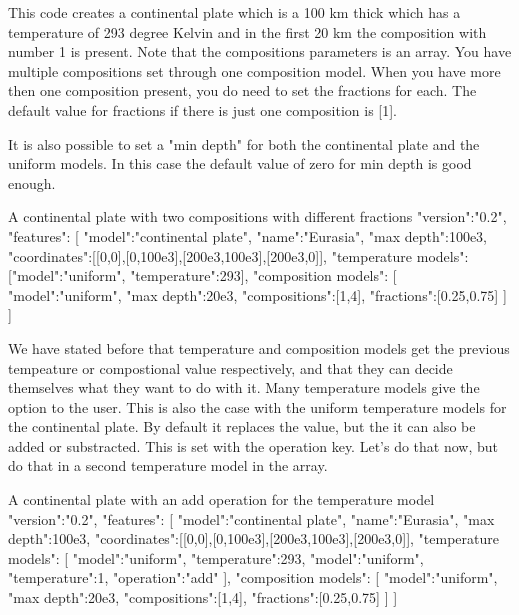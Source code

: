 \documentclass{book}
\begin{document}
This code creates a continental plate which is a 100 km thick which has a temperature of 293 degree Kelvin and in the first 20 km the composition with number 1 is present. Note that the compositions parameters is an array. You have multiple compositions set through one composition model. When you have more then one composition present, you do need to set the fractions for each. The default value for fractions if there is just one composition is [1].
\begin{remark}
It is also possible to set a "min depth" for both the continental plate and the uniform models. In this case the default value of zero for min depth is good enough.
\end{remark}

\begin{javascriptcode}{A continental plate with two compositions with different fractions}{}
{
  "version":"0.2",
  "features":
  [
    {
      "model":"continental plate", "name":"Eurasia", "max depth":100e3,
      "coordinates":[[0,0],[0,100e3],[200e3,100e3],[200e3,0]],
      "temperature models":[{"model":"uniform", "temperature":293}],
      "composition models":
      [
        {
          "model":"uniform", "max depth":20e3, "compositions":[1,4], 
          "fractions":[0.25,0.75]
        }
      ]
    }
  ]
}
\end{javascriptcode}

We have stated before that temperature and composition models get the previous tempeature or compostional value respectively, and that they can decide themselves what they want to do with it. Many temperature models give the option to the user. This is also the case with the uniform temperature models for the continental plate. By default it replaces the value, but the it can also be added or substracted. This is set with the operation key. Let's do that now, but do that in a second temperature model in the array.

\begin{javascriptcode}{A continental plate with an add operation for the temperature model}{}
{
  "version":"0.2",
  "features":
  [
    {
      "model":"continental plate", "name":"Eurasia", "max depth":100e3,
      "coordinates":[[0,0],[0,100e3],[200e3,100e3],[200e3,0]],
      "temperature models":
      [
        {"model":"uniform", "temperature":293},
        {"model":"uniform", "temperature":1, "operation":"add"}
      ],
      "composition models":
      [
        {
          "model":"uniform", "max depth":20e3, "compositions":[1,4], 
          "fractions":[0.25,0.75]
        }
      ]
    }
  ]
}
\end{javascriptcode}
\end{document}
